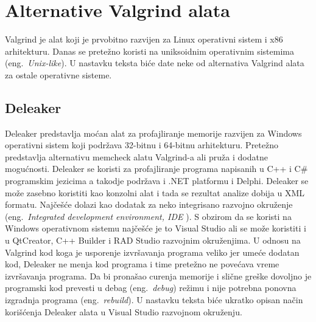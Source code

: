 \documentclass[a4paper]{article}
\begin{document}
\section{Alternative Valgrind alata}
Valgrind je alat koji je prvobitno razvijen za Linux operativni sistem i x86 arhitekturu. Danas se pretežno koristi na uniksoidnim operativnim sistemima (eng.~{\em Unix-like}). U nastavku teksta biće date neke od alternativa Valgrind alata za ostale operativne sisteme.

\subsection{Deleaker}
Deleaker predstavlja moćan alat za profajliranje memorije razvijen za Windows operativni sistem koji podržava 32-bitnu i 64-bitnu arhitekturu. Pretežno predstavlja alternativu memcheck alatu Valgrind-a ali pruža i dodatne mogućnosti. Deleaker se koristi za profajliranje programa napisanih u C++ i C\# programskim jezicima a takodje podržava i .NET platformu i Delphi. Deleaker se može zasebno koristiti kao konzolni alat i tada se rezultat analize dobija u XML formatu. Najčešće dolazi kao dodatak za neko integrisano razvojno okruženje (eng.~{\em Integrated development environment, IDE }). S obzirom da se koristi na Windows operativnom sistemu najčešće je to Visual Studio ali se može koristiti i u QtCreator, C++ Builder i RAD Studio razvojnim okruženjima. U odnosu na Valgrind kod koga je usporenje izvršavanja programa veliko jer umeće dodatan kod, Deleaker ne menja kod programa i time pretežno ne povećava vreme izvršavanja programa. Da bi pronašao curenja memorije i slične greške dovoljno je programski kod prevesti u debag (eng.~{\em debug}) režimu i nije potrebna ponovna izgradnja programa (eng.~{\em rebuild}).\cite{deleaker-blog} U nastavku teksta biće ukratko opisan način korišćenja Deleaker alata u Visual Studio razvojnom okruženju.
\end{document}
